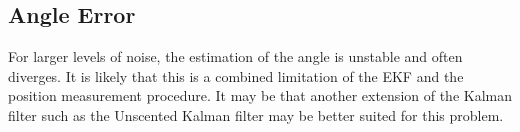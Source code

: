 \subsection{Angle Error}
For larger levels of noise, the estimation of the angle is unstable and often diverges. It is likely that this is a combined limitation of the EKF and the position measurement procedure. It may be that another extension of the Kalman filter such as the Unscented Kalman filter may be better suited for this problem. 